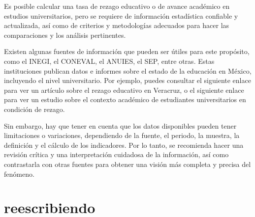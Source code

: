 \documentclass{article}
\begin{document}
Es posible calcular una tasa de rezago educativo o de avance académico en estudios universitarios, pero se requiere de información estadística confiable y actualizada, así como de criterios y metodologías adecuados para hacer las comparaciones y los análisis pertinentes.

Existen algunas fuentes de información que pueden ser útiles para este propósito, como el INEGI, el CONEVAL, el ANUIES, el SEP, entre otras. Estas instituciones publican datos e informes sobre el estado de la educación en México, incluyendo el nivel universitario. Por ejemplo, puedes consultar el siguiente enlace \cite{fuente22} para ver un artículo sobre el rezago educativo en Veracruz, o el siguiente enlace \cite{fuente24} para ver un estudio sobre el contexto académico de estudiantes universitarios en condición de rezago.

Sin embargo, hay que tener en cuenta que los datos disponibles pueden tener limitaciones o variaciones, dependiendo de la fuente, el periodo, la muestra, la definición y el cálculo de los indicadores. Por lo tanto, se recomienda hacer una revisión crítica y una interpretación cuidadosa de la información, así como contrastarla con otras fuentes para obtener una visión más completa y precisa del fenómeno.


\section{reescribiendo}
\end{document}
